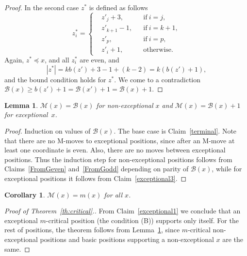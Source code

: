 \documentclass{article}
\newtheorem{lemma}{Lemma}
\newtheorem{corollary}{Corollary}
\theoremstyle{definition}
\def\B{\mathcal{B}}
\def\M{\mathcal{M}}
\begin{document}
\begin{proof}
In the second case $z^*$ is defined as follows
\[
z^*_i = \left\{
\begin{aligned}
  &z'_j +3 , &&\text{if}\ i=j,\\
  &z'_{k+1} -1 , &&\text{if}\ i=k+1,\\
  &z'_{p}  , &&\text{if}\ i=p,\\
  &z'_i+1, &&\text{otherwise.}
\end{aligned}\right.
\]
Again,  $z^*\preceq x$, and
all $z^*_i$ are even, and
\[|z^*| = kb(z') + 3-1+(k-2) = k(b(z')+1),\] and the bound condition holds for $z^*$. We come to a contradiction  $\B(x)\geq b(z')+1 = \B(x')+1 = \B(x)+1$.
\end{proof}

\begin{lemma}\label{M=G}
   $\M(x)=\B(x)$ for non-exceptional $x$ and $\M(x)=\B(x)+1$ for exceptional~$x$.
\end{lemma}
\begin{proof}
  Induction on values of $\B(x)$. The base case is Claim~\ref{terminal}.
  Note that there are no M-moves to exceptional positions, since after an M-move at least one coordinate is even. Also, there are no moves between  exceptional positions. Thus the induction step for non-exceptional positions follows from Claims~\ref{FromGeven} and~\ref{FromGodd} depending on parity of $\B(x)$, while for exceptional positions it follows from Claim~\ref{exceptional3}.
\end{proof}

\begin{corollary}\label{M=m}
  $\M(x) = m(x)$ for all $x$.
\end{corollary}

\begin{proof}[Proof of Theorem~\ref{th:critical}.]
From Claim~\ref{exceptional1} we conclude that an exceptional $m$-critical position (the condition (B)) supports only itself. For the rest of positions, the theorem follows from 
  Lemma~\ref{M=G},  since  $m$-critical non-exceptional positions and  basic positions supporting a non-exceptional $x$ are the same.
\end{proof}
\end{document}
